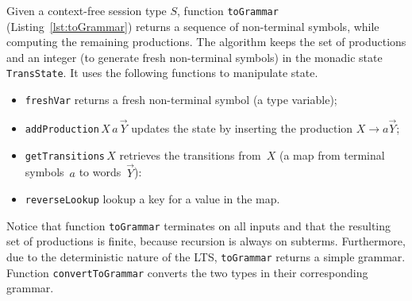 Given a context-free session type $S$, 
function \lstinline|toGrammar| (Listing~\ref{lst:toGrammar}) returns a
sequence of non-terminal symbols, while computing the remaining
productions.
%
%
The algorithm keeps the set of productions and an integer (to generate
fresh non-terminal symbols) in the monadic state
\lstinline{TransState}. It uses the following functions to manipulate
state.
%
\begin{itemize}
\item \lstinline{freshVar} returns a fresh non-terminal symbol (a type
  variable);
\item \lstinline{addProduction}$\,X\,a\,\vec Y$ updates the state by inserting
  the production $X\rightarrow a\vec Y$;
\item \lstinline|getTransitions|$\,X$ retrieves the transitions
  from~$X$ (a map from terminal symbols~$a$ to words~$\vec Y$):
\item \lstinline|reverseLookup| lookup a key for a value in the map.
\end{itemize}



Notice that function \lstinline|toGrammar| terminates on all inputs and
that the resulting set of productions is finite, because recursion is
always on subterms.
%
Furthermore, due to the deterministic nature of the LTS,
\lstinline|toGrammar| returns a simple grammar.
%
Function \lstinline|convertToGrammar| converts the two types
in their corresponding grammar.

